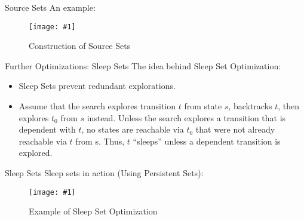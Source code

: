 \documentclass[9pt]{beamer}
\newcommand{\trace}[2]{
\begin{figure}[H]
\centering
\texttt{[image: \#1]}
\caption{#2}
\label{#2}
\end{figure}
}
\begin{document}
\begin{frame}{Source Sets}
An example:
\trace{../img/source.pdf}{Construction of Source Sets}
\end{frame}

\begin{frame}{Further Optimizations: Sleep Sets}
The idea behind Sleep Set Optimization:

\begin{itemize}[<+->]
\item Sleep Sets prevent redundant explorations.
\item Assume that the search explores transition $t$ from state $s$, backtracks $t$, then explores $t_0$ from $s$ instead.
Unless the search explores a transition that is dependent with $t$, no states are reachable via $t_0$ that were not
already reachable via $t$ from s. Thus, $t$ ``sleeps'' unless a dependent transition is explored.
    
\end{itemize}
\end{frame}

\begin{frame}{Sleep Sets}
Sleep sets in action (Using Persistent Sets):
\trace{../img/sleep.pdf}{Example of Sleep Set Optimization}
\end{frame}
\end{document}
